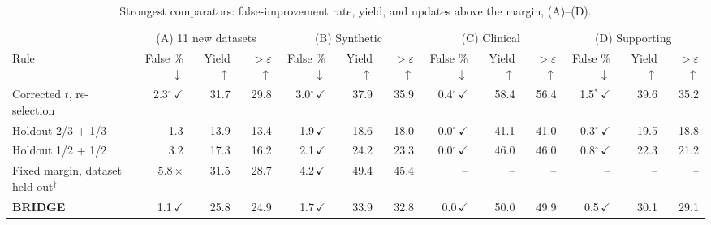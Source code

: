 \begin{table}[!t]
\centering
\footnotesize
\setlength{\tabcolsep}{3.5pt}
\caption{Strongest comparators: false-improvement rate, yield, and updates above the margin, (A)--(D).}
\label{tab:strongest}
\begin{tabular}{@{}lrrrrrrrrrrrr@{}}
\toprule
 & \multicolumn{3}{c}{(A) 11 new datasets} & \multicolumn{3}{c}{(B) Synthetic} & \multicolumn{3}{c}{(C) Clinical} & \multicolumn{3}{c}{(D) Supporting} \\
\cmidrule(lr){2-4}\cmidrule(lr){5-7}\cmidrule(lr){8-10}\cmidrule(l){11-13}
Rule & False \% $\downarrow$ & Yield $\uparrow$ & ${>}\varepsilon$ $\uparrow$ & False \% $\downarrow$ & Yield $\uparrow$ & ${>}\varepsilon$ $\uparrow$ & False \% $\downarrow$ & Yield $\uparrow$ & ${>}\varepsilon$ $\uparrow$ & False \% $\downarrow$ & Yield $\uparrow$ & ${>}\varepsilon$ $\uparrow$ \\
\midrule
Corrected $t$, re-selection & 2.3$^{\circ}$\,$\checkmark$ & 31.7 & 29.8 & 3.0$^{\circ}$\,$\checkmark$ & 37.9 & 35.9 & 0.4$^{\circ}$\,$\checkmark$ & 58.4 & 56.4 & 1.5$^{*}$\,$\checkmark$ & 39.6 & 35.2 \\
Holdout 2/3 + 1/3 & 1.3 & 13.9 & 13.4 & 1.9\,$\checkmark$ & 18.6 & 18.0 & 0.0$^{\circ}$\,$\checkmark$ & 41.1 & 41.0 & 0.3$^{\circ}$\,$\checkmark$ & 19.5 & 18.8 \\
Holdout 1/2 + 1/2 & 3.2 & 17.3 & 16.2 & 2.1\,$\checkmark$ & 24.2 & 23.3 & 0.0$^{\circ}$\,$\checkmark$ & 46.0 & 46.0 & 0.8$^{\circ}$\,$\checkmark$ & 22.3 & 21.2 \\
Fixed margin, dataset held out$^{\dagger}$ & 5.8\,$\times$ & 31.5 & 28.7 & 4.2\,$\checkmark$ & 49.4 & 45.4 & -- & -- & -- & -- & -- & -- \\
\textbf{BRIDGE} & 1.1\,$\checkmark$ & 25.8 & 24.9 & 1.7\,$\checkmark$ & 33.9 & 32.8 & 0.0\,$\checkmark$ & 50.0 & 49.9 & 0.5\,$\checkmark$ & 30.1 & 29.1 \\
\bottomrule
\end{tabular}


\end{table}
